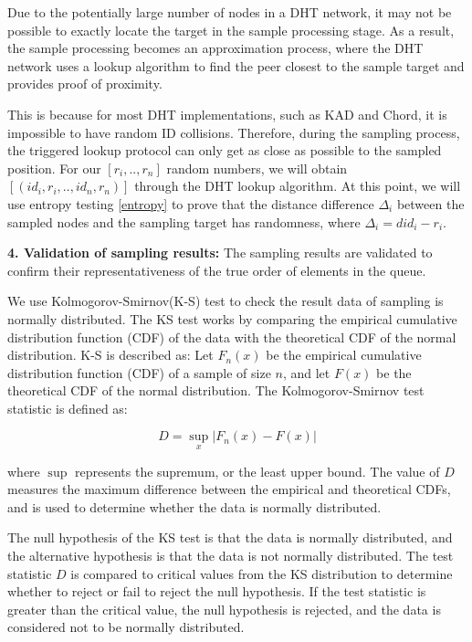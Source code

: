 \documentclass[twocolumn]{article}
\begin{document}
Due to the potentially large number of nodes in a DHT\cite{Chord} network, it may not be possible to exactly locate the target in the sample processing stage. As a result, the sample processing becomes an approximation process, where the DHT network uses a lookup algorithm to find the peer closest to the sample target and provides proof of proximity.

This is because for most DHT implementations, such as KAD and Chord, it is impossible to have random ID collisions. Therefore, during the sampling process, the triggered lookup protocol can only get as close as possible to the sampled position. For our $[r_i,.., r_n]$ random numbers, we will obtain $[(id_i, r_i, .., id_n, r_n)]$ through the DHT lookup algorithm. At this point, we will use entropy testing \ref{entropy} to prove that the distance difference $\Delta_i$ between the sampled nodes and the sampling target has randomness, where $\Delta_i = did_i - r_i$.

\textbf{4. Validation of sampling results:} The sampling results are validated to confirm their representativeness of the true order of elements in the queue.

We use Kolmogorov-Smirnov(K-S) test to check the result data of sampling is normally distributed. The KS test works by comparing the empirical cumulative distribution function (CDF) of the data with the theoretical CDF of the normal distribution. K-S is described as:
Let $F_{n}(x)$ be the empirical cumulative distribution function (CDF) of a sample of size $n$, and let $F(x)$ be the theoretical CDF of the normal distribution. The Kolmogorov-Smirnov test statistic is defined as:

\begin{equation}
D = \sup_{x} \left| F_{n}(x) - F(x) \right|
\end{equation}

where $\sup$ represents the supremum, or the least upper bound. The value of $D$ measures the maximum difference between the empirical and theoretical CDFs, and is used to determine whether the data is normally distributed.

The null hypothesis of the KS test is that the data is normally distributed, and the alternative hypothesis is that the data is not normally distributed. The test statistic $D$ is compared to critical values from the KS distribution to determine whether to reject or fail to reject the null hypothesis. If the test statistic is greater than the critical value, the null hypothesis is rejected, and the data is considered not to be normally distributed.
\end{document}

